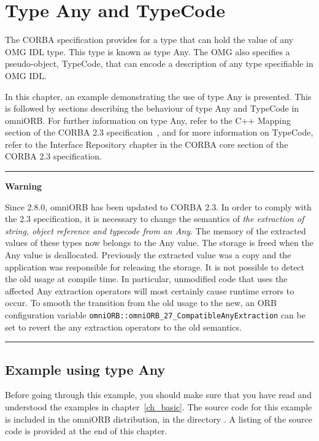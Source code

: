 \documentclass[11pt,twoside,a4paper]{book}
\newcommand{\code}[1]{\texttt{#1}}
\newenvironment{statement}%
 {\noindent\begin{minipage}{\textwidth}%
  \vspace{.5\baselineskip}%
  \noindent\rule{\textwidth}{2pt}%
  \vspace{.25\baselineskip}%
  \begin{list}{}{\setlength{\listparindent}{0em}%
                 \setlength{\itemindent}{0em}%
                 \setlength{\leftmargin}{1.5em}%
                 \setlength{\rightmargin}{\leftmargin}%
                 \setlength{\topsep}{0pt}%
                 \setlength{\partopsep}{0pt}}
  \item\relax}
 {\end{list}%
  \vspace{-.25\baselineskip}%
  \noindent\rule{\textwidth}{2pt}%
  \vspace{.5\baselineskip}%
  \end{minipage}}
\newcommand{\file}{\begingroup \urlstyle{tt}\Url}
\begin{document}
\chapter{Type Any and TypeCode}
\label{ch_any}

The CORBA specification provides for a type that can hold the value of
any OMG IDL type. This type is known as type Any. The OMG also
specifies a pseudo-object, TypeCode, that can encode a description of
any type specifiable in OMG IDL.

In this chapter, an example demonstrating the use of type Any is
presented.  This is followed by sections describing the behaviour of
type Any and TypeCode in omniORB.  For further information on type
Any, refer to the C++ Mapping section of the CORBA 2.3
specification~\cite{corba23-spec}, and for more information on
TypeCode, refer to the Interface Repository chapter in the CORBA core
section of the CORBA 2.3 specification.


\begin{statement}
\centerline{\textbf{Warning}}

Since 2.8.0, omniORB has been updated to CORBA 2.3. In order to comply
with the 2.3 specification, it is necessary to change the semantics of
\emph{the extraction of string, object reference and typecode from an
Any}. The memory of the extracted values of these types now belongs to
the Any value. The storage is freed when the Any value is deallocated.
Previously the extracted value was a copy and the application was
responsible for releasing the storage. It is not possible to detect
the old usage at compile time. In particular, unmodified code that
uses the affected Any extraction operators will most certainly cause
runtime errors to occur.  To smooth the transition from the old usage
to the new, an ORB configuration variable
\code{omniORB::omniORB\_27\_CompatibleAnyExtraction} can be set to
revert the any extraction operators to the old semantics.

\end{statement}


\section{Example using type Any}

Before going through this example, you should make sure that you have
read and understood the examples in chapter~\ref{ch_basic}.  The
source code for this example is included in the omniORB distribution,
in the directory \file{src/examples/anyExample}. A listing of the
source code is provided at the end of this chapter.
\end{document}
